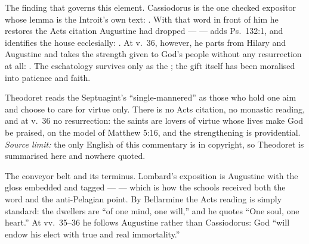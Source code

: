 \begin{witnessnote}
The finding that governs this element. Cassiodorus is the one checked
expositor whose lemma is the Introit's own text: . With that word in front of him he restores the Acts
citation Augustine had dropped ---  --- adds Ps.~132:1, and identifies the house
ecclesially: . At v.~36, however, he
parts from Hilary and Augustine and takes the strength given to God's people
without any resurrection at all: .
The eschatology survives only as the ; the gift itself has been
moralised into patience and faith.
\end{witnessnote}

\begin{witnessnote}
Theodoret reads the Septuagint's ``single-mannered'' as those who hold one aim
and choose to care for virtue only. There is no Acts citation, no monastic
reading, and at v.~36 no resurrection: the saints are lovers of virtue whose
lives make God be praised, on the model of Matthew 5:16, and the strengthening
is providential. \textit{Source limit:} the only English of this commentary is
in copyright, so Theodoret is summarised here and nowhere quoted.
\end{witnessnote}

\begin{witnessnote}
The conveyor belt and its terminus. Lombard's exposition is Augustine with the
gloss embedded and tagged ---  --- which is
how the schools received both the word and the anti-Pelagian point. By
Bellarmine the Acts reading is simply standard: the dwellers are ``of one mind,
one will,'' and he quotes ``One soul, one heart.'' At vv.~35--36 he follows
Augustine rather than Cassiodorus: God ``will endow his elect with true and
real immortality.''
\end{witnessnote}

